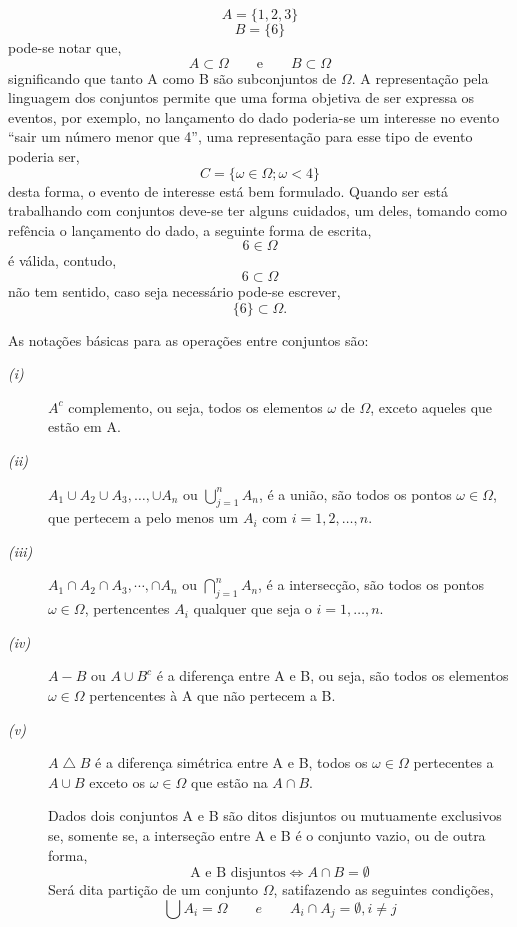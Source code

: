 $$ A = \{1,2,3\}$$
$$ B = \{6\}$$
pode-se notar que,
$$ A \subset \Omega \qquad  \textrm{e} \qquad  B \subset \Omega $$       
significando que tanto A como B s\~{a}o subconjuntos de $\Omega$. A representa\c{c}\~{a}o pela linguagem dos conjuntos permite que
uma forma objetiva de ser expressa os eventos, por exemplo, no lan\c{c}amento do dado poderia-se um interesse no evento 
``sair um n\'{u}mero menor que 4'', uma representa\c{c}\~{a}o para esse tipo de evento poderia ser,
$$ C = \{\omega \in \Omega; \omega < 4 \}$$ 
desta forma, o evento de interesse est\'{a} bem formulado. Quando ser est\'{a} trabalhando com conjuntos deve-se ter alguns cuidados,
um deles, tomando como ref\^{e}ncia o lan\c{c}amento do dado, a seguinte forma de escrita,
$$ 6 \in \Omega $$
\'{e} v\'{a}lida, contudo,
$$ 6 \subset \Omega $$
n\~{a}o tem sentido,
\newline
caso seja necess\'{a}rio pode-se escrever,
$$\{6 \} \subset \Omega .$$
\par
As nota\c{c}\~{o}es b\'{a}sicas para as opera\c{c}\~{o}es entre conjuntos s\~{a}o:
\begin{description}
  \item[\textit{(i)}] $A^c$ complemento, ou seja, todos os elementos $\omega$ de $\Omega$, exceto aqueles que est\~{a}o em A.
  \item[\textit{(ii)}] $A_1 \cup A_2 \cup A_3, \dots ,\cup A_n$  ou $ \bigcup_{j = 1}^{n} A_n $, \'{e} a uni\~{a}o, s\~{a}o todos os 
	pontos $\omega \in \Omega$, que pertecem a pelo menos um $A_i$ com $ i = 1,2, \dots,n$.
  \item[\textit{(iii)}]  $A_1 \cap A_2 \cap A_3, \cdots ,\cap A_n$  ou $ \bigcap_{j = 1}^{n} A_n $, \'{e} a intersec\c{c}\~{a}o,
	s\~{a}o todos os pontos $\omega \in \Omega$, pertencentes $A_i$ qualquer que seja o $i = 1, \dots, n$.
  \item [\textit{(iv)}] $A - B$ ou $A \cup B^c$ \'{e} a diferen\c{c}a entre A e B, ou seja, s\~{a}o todos os elementos
	$ \omega \in \Omega$ pertencentes \`{a} A que n\~{a}o pertecem a B.
  \item [\textit{(v)}]$A \bigtriangleup B$ \'{e} a diferen\c{c}a sim\'{e}trica entre A e B, todos os $\omega \in \Omega$
	pertecentes a $A \cup B$ exceto os $\omega \in \Omega$ que est\~{a}o na $A \cap B$. 
\par
Dados dois conjuntos A e B s\~{a}o ditos disjuntos ou mutuamente exclusivos se, somente se, a interse\c{c}\~{a}o entre A e B
\'{e} o conjunto vazio, ou de outra forma,
$$ \textrm{A e B disjuntos} \Leftrightarrow A \cap B = \emptyset$$
Ser\'{a} dita parti\c{c}\~{a}o de um conjunto $\Omega$, satifazendo as seguintes condi\c{c}\~{o}es,
$$ \bigcup A_i = \Omega \qquad \textit{e} \qquad A_i \cap A_j = \emptyset, i \neq j$$
\end{description}
